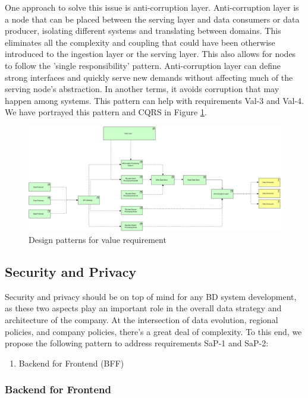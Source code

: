\documentclass{bmcart}
\begin{document}
One approach to solve this issue is anti-corruption layer. Anti-corruption layer is a node that can be placed between the serving layer and data consumers or data producer, isolating different systems and translating between domains. This eliminates all the complexity and coupling that could have been otherwise introduced to the ingestion layer or the serving layer. This also allows for nodes to follow the 'single responsibility' pattern. Anti-corruption layer can define strong interfaces and quickly serve new demands without affecting much of the serving node's abstraction. In another terms, it avoids corruption that may happen among systems. This pattern can help with requirements Val-3 and Val-4. We have portrayed this pattern and CQRS in Figure \ref{fig:Value Requirements}.

\begin{figure}[h]
    \includegraphics[width=12cm]{Media/Value Requirement.jpg}
    \caption[]{Design patterns for value requirement }
    \label{fig:Value Requirements}
\end{figure}

\subsection{Security and Privacy}

Security and privacy should be on top of mind for any BD system development, as these two aspects play an important role in the overall data strategy and architecture of the company. At the intersection of data evolution, regional policies, and company policies, there's a great deal of complexity. To this end, we propose the following pattern to address requirements SaP-1 and SaP-2:

\begin{enumerate}
  \item Backend for Frontend (BFF)
\end{enumerate}

\subsubsection{Backend for Frontend}
\end{document}
